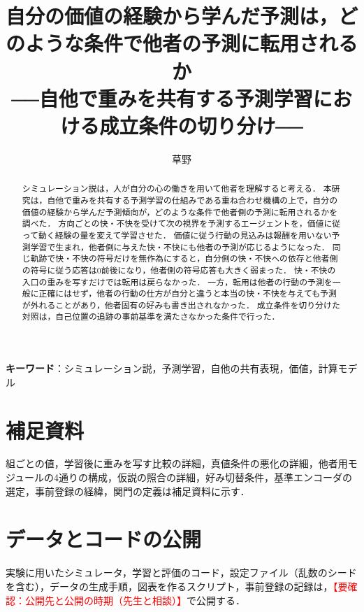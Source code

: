 \documentclass[uplatex,dvipdfmx,a4paper,11pt]{jsarticle}
\title{自分の価値の経験から学んだ予測は，どのような条件で他者の予測に転用されるか\\
\large ──自他で重みを共有する予測学習における成立条件の切り分け──}
\author{草野 \todo{【要確認：氏名・所属・共著者】}}
\date{}
\newcommand{\todo}[1]{\textcolor{red}{#1}}
\begin{document}
\maketitle

\begin{abstract}
シミュレーション説は，人が自分の心の働きを用いて他者を理解すると考える．
本研究は，自他で重みを共有する予測学習の仕組みである重ね合わせ機構の上で，自分の価値の経験から学んだ予測傾向が，どのような条件で他者側の予測に転用されるかを調べた．
方向ごとの快・不快を受けて次の視界を予測するエージェントを，価値に従って動く経験の量を変えて学習させた．
価値に従う行動の見込みは報酬を用いない予測学習で生まれ，他者側に与えた快・不快にも他者の予測が応じるようになった．
同じ軌跡で快・不快の符号だけを無作為にすると，自分側の快・不快への依存と他者側の符号に従う応答は0前後になり，他者側の符号応答も大きく弱まった．
快・不快の入口の重みを写すだけでは転用は戻らなかった．
一方，転用は他者の行動の予測を一般に正確にはせず，他者の行動の仕方が自分と違うと本当の快・不快を与えても予測が外れることがあり，他者固有の好みも書き出されなかった．
成立条件を切り分けた対照は，自己位置の追跡の事前基準を満たさなかった条件で行った．
\end{abstract}

\noindent\textbf{キーワード}：シミュレーション説，予測学習，自他の共有表現，価値，計算モデル








\section*{補足資料}
組ごとの値，学習後に重みを写す比較の詳細，真値条件の悪化の詳細，他者用モジュールの4通りの構成，仮説の照合の詳細，好み切替条件，基準エンコーダの選定，事前登録の経緯，関門の定義は補足資料に示す．

\section*{データとコードの公開}
実験に用いたシミュレータ，学習と評価のコード，設定ファイル（乱数のシードを含む），データの生成手順，図表を作るスクリプト，事前登録の記録は，\todo{【要確認：公開先と公開の時期（先生と相談）】}で公開する．



\end{document}
